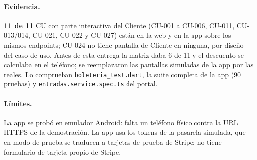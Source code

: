\paragraph{Evidencia.} \textbf{11 de 11} CU con parte interactiva del Cliente (CU-001 a CU-006,
CU-011, CU-013/014, CU-021, CU-022 y CU-027) están en la web y en la app sobre los mismos
endpoints; CU-024 no tiene pantalla de Cliente en ninguna, por diseño del caso de uso. Antes de esta
entrega la matriz daba 6 de 11 y el descuento se calculaba en el teléfono; se reemplazaron las
pantallas simuladas de la app por las reales. Lo comprueban \texttt{boleteria\_test.dart}, la suite
completa de la app (90 pruebas) y \texttt{entradas.service.spec.ts} del portal.

\paragraph{Límites.} La app se probó en emulador Android: falta un teléfono físico contra la URL
HTTPS de la demostración. La app usa los tokens de la pasarela simulada, que en modo de prueba se
traducen a tarjetas de prueba de Stripe; no tiene formulario de tarjeta propio de Stripe.
